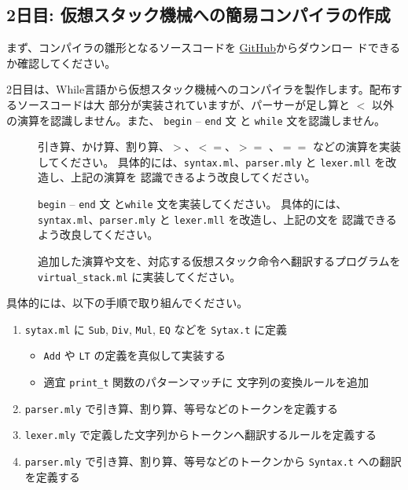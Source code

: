 \documentclass[a4paper,11pt]{jsarticle}
\begin{document}
\subsection{2日目: 仮想スタック機械への簡易コンパイラの作成}


まず、コンパイラの雛形となるソースコードを
\href{https://github.com/tmu-compiler-info-sys-exp-I/compiler-day2}{GitHub}からダウンロー
ドできるか確認してください。

2日目は、While言語から仮想スタック機械へのコンパイラを製作します。配布するソースコードは大
部分が実装されていますが、パーサーが足し算と $<$ 以外の演算を認識しません。また、
\verb|begin| -- \verb|end| 文 と \verb|while| 文を認識しません。

\begin{description}
\item [] 引き算、かけ算、割り算、$>$、$<=$、$>=$ 、$==$ などの演算を実装してください。
  具体的には、\verb|syntax.ml|、\verb|parser.mly| と \verb|lexer.mll| を改造し、上記の演算を
  認識できるよう改良してください。
\item [] \verb|begin| -- \verb|end| 文 と\verb|while| 文を実装してください。
  具体的には、\verb|syntax.ml|、\verb|parser.mly| と \verb|lexer.mll| を改造し、上記の文を
  認識できるよう改良してください。
\item [] 追加した演算や文を、対応する仮想スタック命令へ翻訳するプログラムを
  \verb|virtual_stack.ml| に実装してください。
\end{description}

具体的には、以下の手順で取り組んでください。

\noindent{}

\begin{enumerate}
\item \verb|sytax.ml| に \verb|Sub|, \verb|Div|, \verb|Mul|, \verb|EQ| などを
  \verb|Sytax.t| に定義
  \begin{itemize}
  \item \verb|Add| や \verb|LT| の定義を真似して実装する
  \item 適宜 \verb|print_t| 関数のパターンマッチに 文字列の変換ルールを追加
  \end{itemize}
\item \verb|parser.mly| で引き算、割り算、等号などのトークンを定義する
\item \verb|lexer.mly| で定義した文字列からトークンへ翻訳するルールを定義する
\item \verb|parser.mly| で引き算、割り算、等号などのトークンから \verb|Syntax.t| への翻訳
  を定義する
\end{enumerate}
\end{document}
